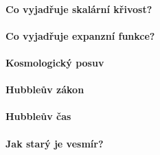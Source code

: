 \documentclass[11pt,a4paper,notitlepage,twocolumn]{article}
\begin{document}
\paragraph{Co vyjadřuje skalární křivost?}
\paragraph{Co vyjadřuje expanzní funkce?}
\paragraph{Kosmologický posuv}
\paragraph{Hubbleův zákon}
\paragraph{Hubbleův čas}
\paragraph{Jak starý je vesmír?}
\end{document}
